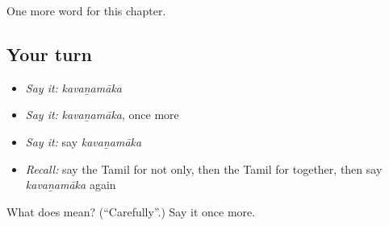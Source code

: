 \begin{grammarlens}[title={What you've built}]
One more word for this chapter.
\end{grammarlens}

\subsection*{Your turn}
\begin{itemize}
\raggedright
  \item \emph{Say it:} \emph{kavaṉamāka}
  \item \emph{Say it:} \emph{kavaṉamāka}, once more
  \item \emph{Say it:} say \emph{kavaṉamāka}
  \item \emph{Recall:} say the Tamil for not only, then the Tamil for together, then say \emph{kavaṉamāka} again
\end{itemize}

\begin{tcolorbox}[breakable,colback=teal!4,colframe=teal!35!black,title={Before you move on}]
What does  mean? (\textquotedblleft{}Carefully\textquotedblright{}.) Say it once more.
\end{tcolorbox}

